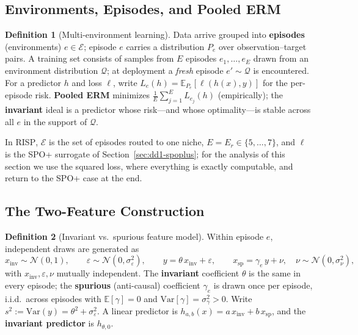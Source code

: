 \documentclass[11pt,a4paper]{article}
\theoremstyle{definition}
\newtheorem{definition}{Definition}[section]
\theoremstyle{plain}
\newcommand{\E}{\mathbb{E}}
\newcommand{\Var}{\mathrm{Var}}
\newcommand{\N}{\mathcal{N}}
\newcommand{\nm}{\textsc{RISP}}
\begin{document}
\subsection{Environments, Episodes, and Pooled ERM}

\begin{definition}[Multi-environment learning]
\label{def:dd1-environments}
Data arrive grouped into \textbf{episodes} (environments)
$e \in \mathcal{E}$; episode $e$ carries a distribution $P_e$ over
observation--target pairs. A training set consists of samples from $E$
episodes $e_1, \dots, e_E$ drawn from an environment distribution
$\mathcal{Q}$; at deployment a \emph{fresh} episode $e' \sim \mathcal{Q}$ is
encountered. For a predictor $h$ and loss $\ell$, write
$L_e(h) = \E_{P_e}[\ell(h(x), y)]$ for the per-episode risk. \textbf{Pooled
ERM} minimizes $\frac{1}{E}\sum_{j=1}^E L_{e_j}(h)$ (empirically); the
\textbf{invariant} ideal is a predictor whose risk---and whose optimality---is
stable across all $e$ in the support of $\mathcal{Q}$.
\end{definition}

In \nm{}, $\mathcal{E}$ is the set of episodes routed to one niche, $E = E_r
\in \{5, \dots, 7\}$, and $\ell$ is the SPO+ surrogate of
Section~\ref{sec:dd1-spoplus}; for the analysis of this section we use the
squared loss, where everything is exactly computable, and return to the SPO+
case at the end.

\subsection{The Two-Feature Construction}

\begin{definition}[Invariant vs.\ spurious feature model]
\label{def:dd1-twofeature}
Within episode $e$, independent draws are generated as
\begin{equation}
\label{eq:dd1-sem}
x_{\mathrm{inv}} \sim \N(0, 1), \qquad
\varepsilon \sim \N(0, \sigma_\varepsilon^2), \qquad
y = \theta\, x_{\mathrm{inv}} + \varepsilon, \qquad
x_{\mathrm{sp}} = \gamma_e\, y + \nu, \quad \nu \sim \N(0, \sigma_\nu^2),
\end{equation}
with $x_{\mathrm{inv}}, \varepsilon, \nu$ mutually independent. The
\textbf{invariant} coefficient $\theta$ is the same in every episode; the
\textbf{spurious} (anti-causal) coefficient $\gamma_e$ is drawn once per
episode, i.i.d.\ across episodes with $\E[\gamma] = 0$ and
$\Var[\gamma] = \sigma_\gamma^2 > 0$. Write $s^2 := \Var(y) = \theta^2 +
\sigma_\varepsilon^2$. A linear predictor is
$h_{a,b}(x) = a\, x_{\mathrm{inv}} + b\, x_{\mathrm{sp}}$, and the
\textbf{invariant predictor} is $h_{\theta, 0}$.
\end{definition}
\end{document}
